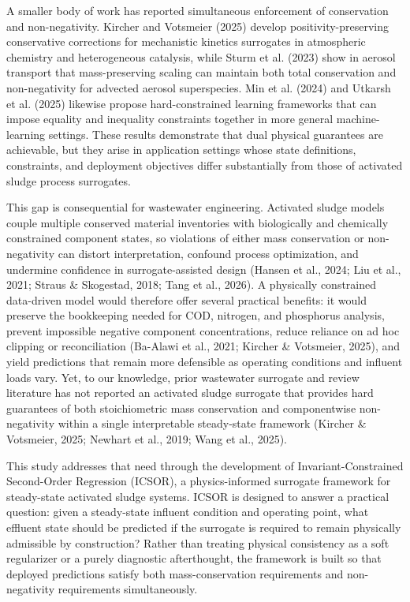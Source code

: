 \documentclass[a4paper,fleqn]{cas-sc}
\newenvironment{revblock}{\begingroup\color{revDefault}}{\endgroup}
\begin{document}
\begin{revblock}
A smaller body of work has reported simultaneous enforcement of conservation and non-negativity. Kircher and Votsmeier (2025) develop positivity-preserving conservative corrections for mechanistic kinetics surrogates in atmospheric chemistry and heterogeneous catalysis, while Sturm et al. (2023) show in aerosol transport that mass-preserving scaling can maintain both total conservation and non-negativity for advected aerosol superspecies. Min et al. (2024) and Utkarsh et al. (2025) likewise propose hard-constrained learning frameworks that can impose equality and inequality constraints together in more general machine-learning settings. These results demonstrate that dual physical guarantees are achievable, but they arise in application settings whose state definitions, constraints, and deployment objectives differ substantially from those of activated sludge process surrogates.

This gap is consequential for wastewater engineering. Activated sludge models couple multiple conserved material inventories with biologically and chemically constrained component states, so violations of either mass conservation or non-negativity can distort interpretation, confound process optimization, and undermine confidence in surrogate-assisted design (Hansen et al., 2024; Liu et al., 2021; Straus \& Skogestad, 2018; Tang et al., 2026). A physically constrained data-driven model would therefore offer several practical benefits: it would preserve the bookkeeping needed for COD, nitrogen, and phosphorus analysis, prevent impossible negative component concentrations, reduce reliance on ad hoc clipping or reconciliation (Ba-Alawi et al., 2021; Kircher \& Votsmeier, 2025), and yield predictions that remain more defensible as operating conditions and influent loads vary. Yet, to our knowledge, prior wastewater surrogate and review literature has not reported an activated sludge surrogate that provides hard guarantees of both stoichiometric mass conservation and componentwise non-negativity within a single interpretable steady-state framework (Kircher \& Votsmeier, 2025; Newhart et al., 2019; Wang et al., 2025).

This study addresses that need through the development of Invariant-Constrained Second-Order Regression (ICSOR), a physics-informed surrogate framework for steady-state activated sludge systems. ICSOR is designed to answer a practical question: given a steady-state influent condition and operating point, what effluent state should be predicted if the surrogate is required to remain physically admissible by construction? Rather than treating physical consistency as a soft regularizer or a purely diagnostic afterthought, the framework is built so that deployed predictions satisfy both mass-conservation requirements and non-negativity requirements simultaneously.


\end{revblock}
\end{document}
